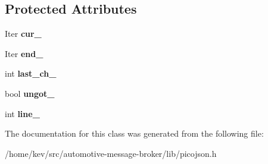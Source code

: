 \subsection*{Protected Attributes}
\begin{DoxyCompactItemize}
\item 
\hypertarget{classpicojson_1_1input_afb97b3422a91d0f3388527a5999c8174}{Iter {\bfseries cur\+\_\+}}\label{classpicojson_1_1input_afb97b3422a91d0f3388527a5999c8174}

\item 
\hypertarget{classpicojson_1_1input_acb4fd4c90d1b0db37bc32ccae16361ab}{Iter {\bfseries end\+\_\+}}\label{classpicojson_1_1input_acb4fd4c90d1b0db37bc32ccae16361ab}

\item 
\hypertarget{classpicojson_1_1input_a198f74377fcf1128e496b5dc06a1aad0}{int {\bfseries last\+\_\+ch\+\_\+}}\label{classpicojson_1_1input_a198f74377fcf1128e496b5dc06a1aad0}

\item 
\hypertarget{classpicojson_1_1input_a01956f4acf46afe7f1d84ea493cb41da}{bool {\bfseries ungot\+\_\+}}\label{classpicojson_1_1input_a01956f4acf46afe7f1d84ea493cb41da}

\item 
\hypertarget{classpicojson_1_1input_a7bbb41c7f78ffc19d3219e38c2858b74}{int {\bfseries line\+\_\+}}\label{classpicojson_1_1input_a7bbb41c7f78ffc19d3219e38c2858b74}

\end{DoxyCompactItemize}


The documentation for this class was generated from the following file\+:\begin{DoxyCompactItemize}
\item 
/home/kev/src/automotive-\/message-\/broker/lib/picojson.\+h\end{DoxyCompactItemize}
